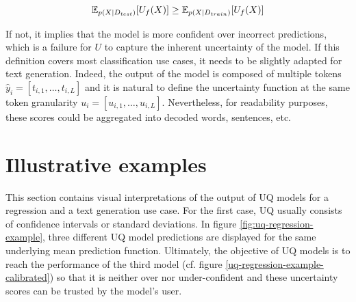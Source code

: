 \begin{equation}
    \operatorname{\mathbb{E}}_{p(X \mid D_{test})} [U_f(X)] \geq  \operatorname{\mathbb{E}}_{p(X \mid D_{train})} [U_f(X)] 
\end{equation}

If not, it implies that the model is more confident over incorrect predictions, which is a failure for $U$ to capture the inherent uncertainty of the model.
If this definition covers most classification use cases, it needs to be slightly adapted for text generation. Indeed, the output of the model is composed of multiple tokens 
$
\hat y_i = [t_{i,1}, \ldots, t_{i,L}]
$
and it is natural to define the uncertainty function at the same token granularity
$
u_i = [u_{i,1}, \ldots, u_{i,L}]
$.
Nevertheless, for readability purposes, these scores could be aggregated into decoded words, sentences, etc.

\section{Illustrative examples}

This section contains visual interpretations of the output of UQ models for a regression and a text generation use case.
For the first case, UQ usually consists of confidence intervals or standard deviations. In figure \ref{fig:uq-regression-example}, three different UQ model predictions are displayed for the same underlying mean prediction function. Ultimately, the objective of UQ models is to reach the performance of the third model (cf. figure \ref{uq-regression-example-calibrated}) so that it is neither over nor under-confident and these uncertainty scores can be trusted by the model's user. 

